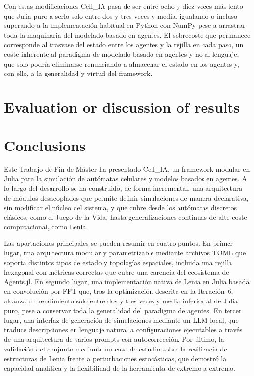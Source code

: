 \documentclass[runningheads]{llncs}
\begin{document}
Con estas modificaciones Cell\_IA pasa de ser entre ocho y diez veces más lento que Julia puro a serlo solo entre dos y tres veces y media, igualando o incluso superando a la implementación habitual en Python con NumPy pese a arrastrar toda la maquinaria del modelado basado en agentes. El sobrecoste que permanece corresponde al trasvase del estado entre los agentes y la rejilla en cada paso, un coste inherente al paradigma de modelado basado en agentes y no al lenguaje, que solo podría eliminarse renunciando a almacenar el estado en los agentes y, con ello, a la generalidad y virtud del framework.




\section{Evaluation or discussion of results}
\label{sec:evaluacion}

\section{Conclusions}
\label{sec:conclusiones}
Este Trabajo de Fin de Máster ha presentado Cell\_IA, un framework modular en Julia para la simulación de autómatas celulares y modelos basados en agentes. A lo largo del desarrollo se ha construido, de forma incremental, una arquitectura de módulos desacoplados que permite definir simulaciones de manera declarativa, sin modificar el núcleo del sistema, y que cubre desde los autómatas discretos clásicos, como el Juego de la Vida, hasta generalizaciones continuas de alto coste computacional, como Lenia.

Las aportaciones principales se pueden resumir en cuatro puntos. En primer lugar, una arquitectura modular y parametrizable mediante archivos TOML que soporta distintos tipos de estado y topologías espaciales, incluida una rejilla hexagonal con métricas correctas que cubre una carencia del ecosistema de Agents.jl. En segundo lugar, una implementación nativa de Lenia en Julia basada en convolución por FFT que, tras la optimización descrita en la Iteración~6, alcanza un rendimiento solo entre dos y tres veces y media inferior al de Julia puro, pese a conservar toda la generalidad del paradigma de agentes. En tercer lugar, una interfaz de generación de simulaciones mediante un LLM local, que traduce descripciones en lenguaje natural a configuraciones ejecutables a través de una arquitectura de varios prompts con autocorrección. Por último, la validación del conjunto mediante un caso de estudio sobre la resiliencia de estructuras de Lenia frente a perturbaciones estocásticas, que demostró la capacidad analítica y la flexibilidad de la herramienta de extremo a extremo.
\end{document}
